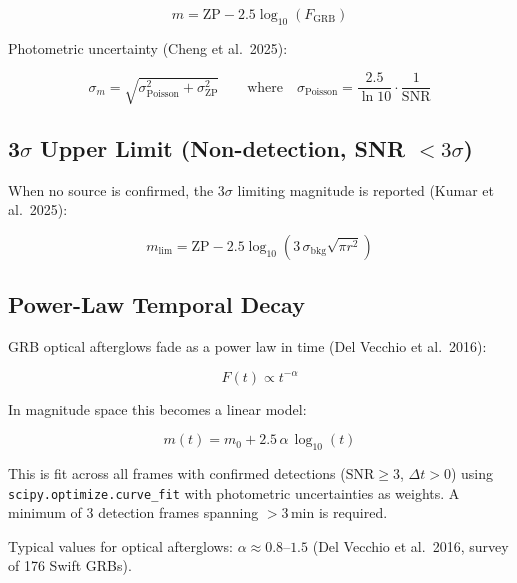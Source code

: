 \documentclass[12pt,a4paper]{article}
\begin{document}
\begin{equation}
    m = \mathrm{ZP} - 2.5 \log_{10}(F_\mathrm{GRB})
\end{equation}

Photometric uncertainty (Cheng et al.\ 2025):

\begin{equation}
    \sigma_m = \sqrt{\sigma_\mathrm{Poisson}^2 + \sigma_\mathrm{ZP}^2}
    \qquad \text{where} \quad
    \sigma_\mathrm{Poisson} = \frac{2.5}{\ln 10} \cdot \frac{1}{\mathrm{SNR}}
\end{equation}

\subsection{3$\sigma$ Upper Limit (Non-detection, SNR $< 3\sigma$)}

When no source is confirmed, the 3$\sigma$ limiting magnitude is reported
(Kumar et al.\ 2025):

\begin{equation}
    m_\mathrm{lim} = \mathrm{ZP} - 2.5 \log_{10}
    \!\left(3\,\sigma_\mathrm{bkg}\sqrt{\pi r^2}\right)
\end{equation}

\subsection{Power-Law Temporal Decay}

GRB optical afterglows fade as a power law in time (Del Vecchio et al.\
2016):

\begin{equation}
    F(t) \propto t^{-\alpha}
\end{equation}

In magnitude space this becomes a linear model:

\begin{equation}
    m(t) = m_0 + 2.5\,\alpha\,\log_{10}(t)
\end{equation}

This is fit across all frames with confirmed detections
($\mathrm{SNR} \geq 3$, $\Delta t > 0$) using
\texttt{scipy.optimize.curve\_fit} with photometric uncertainties as
weights. A minimum of 3 detection frames spanning $>3$\,min is required.

Typical values for optical afterglows: $\alpha \approx 0.8$--$1.5$
(Del Vecchio et al.\ 2016, survey of 176 Swift GRBs).

\end{document}
